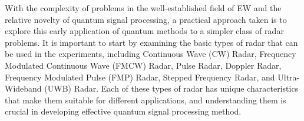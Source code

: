 With the complexity of problems in the well-established field of \ac{EW} and the relative novelty of quantum signal processing, a practical approach taken is to explore this early application of quantum methods to a simpler class of radar problems.
It is important to start by examining the basic types of radar that can be used in the experiments, including Continuous Wave (CW) Radar, Frequency Modulated Continuous Wave (FMCW) Radar, Pulse Radar, Doppler Radar, Frequency Modulated Pulse (FMP) Radar, Stepped Frequency Radar, and Ultra-Wideband (UWB) Radar. 
Each of these types of radar has unique characteristics that make them suitable for different applications, and understanding them is crucial in developing effective quantum signal processing method.


